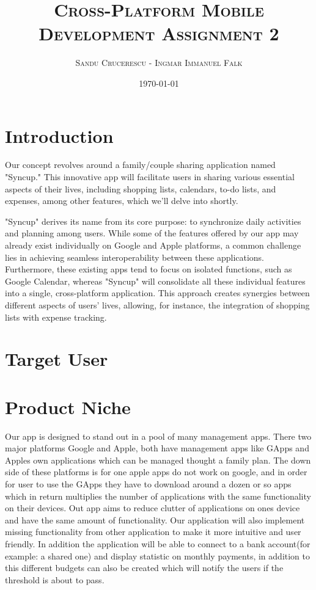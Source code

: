 \documentclass[12pt]{article}
\begin{document}
\title{\textsc{Cross-Platform Mobile Development \linebreak  \large{Assignment 2} }}
\author{\textsc{Sandu Crucerescu - Ingmar Immanuel Falk}}
\date{\textsc{\today}}

\maketitle
\pagebreak

\tableofcontents
\pagebreak

\section{Introduction}

Our concept revolves around a family/couple sharing application named "Syncup." 
This innovative app will facilitate users in sharing various essential aspects of their lives,
 including shopping lists, calendars, to-do lists, and expenses, among other features, which we'll delve into shortly.

"Syncup" derives its name from its core purpose: to synchronize daily activities and planning 
among users. While some of the features offered by our app may already exist individually 
on Google and Apple platforms, a common challenge lies in achieving seamless interoperability 
between these applications. Furthermore, these existing apps tend to focus on isolated functions, 
such as Google Calendar, whereas "Syncup" will consolidate all these individual features into a single,
 cross-platform application. This approach creates synergies between different aspects of users' lives, 
 allowing, for instance, the integration of shopping lists with expense tracking.

\section{Target User}



\pagebreak
\section{Product Niche}
Our app is designed to stand out in a pool of many management apps. There two major platforms Google and Apple, 
both have management apps like GApps and Apples own applications which can be managed thought a family plan. The down side of these
platforms is for one apple apps do not work on google, and in order for user to use the GApps they have to download around a dozen or
so apps which in return multiplies the number of applications with the same functionality on their devices. Out app aims to 
reduce clutter of applications on ones device and have the same amount of functionality. Our application will also implement missing functionality
from other application to make it more intuitive and user friendly. In addition the application will be able
to connect to a bank account(for example: a shared one) and display statistic on monthly payments, in addition to this different budgets 
can also be created which will notify the users if the threshold is about to pass. 
\end{document}
